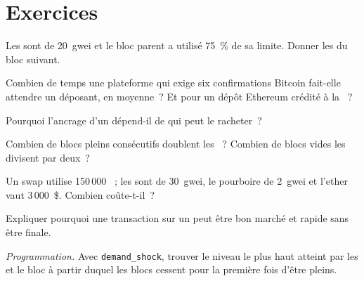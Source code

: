 \section{Exercices}

\begin{exercise}[$\star$]\label{exo:m3:blockchains-for-traders:1}
Les  sont de 20~gwei et le bloc parent a utilisé 75~\% de sa limite. Donner les  du bloc suivant.
\end{exercise}

\begin{exercise}[$\star$]\label{exo:m3:blockchains-for-traders:2}
Combien de temps une plateforme qui exige six confirmations Bitcoin fait-elle attendre un déposant, en moyenne~? Et pour un
dépôt Ethereum crédité à la ~?
\end{exercise}

\begin{exercise}[$\star$]\label{exo:m3:blockchains-for-traders:3}
Pourquoi l'ancrage d'un  dépend-il de qui peut le racheter~?
\end{exercise}

\begin{exercise}[$\star\star$]\label{exo:m3:blockchains-for-traders:4}
Combien de blocs pleins consécutifs doublent les ~? Combien de blocs vides les divisent par deux~?
\end{exercise}

\begin{exercise}[$\star\star$]\label{exo:m3:blockchains-for-traders:5}
Un swap utilise 150\,000 ~; les  sont de 30~gwei, le pourboire de 2~gwei et l'ether vaut 3\,000~\$. Combien coûte-t-il~?
\end{exercise}

\begin{exercise}[$\star\star$]\label{exo:m3:blockchains-for-traders:6}
Expliquer pourquoi une transaction sur un  peut être bon marché et rapide sans être finale.
\end{exercise}

\begin{exercise}[$\star\star\star$]\label{exo:m3:blockchains-for-traders:7}
\emph{Programmation.} Avec \texttt{demand\_shock}, trouver le niveau le plus haut atteint par les  et le bloc à partir duquel
les blocs cessent pour la première fois d'être pleins.
\end{exercise}

